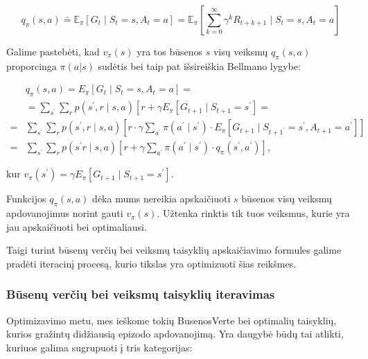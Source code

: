 \documentclass[a4paper, 12pt]{article}
\begin{document}
\begin{equation}
q_{\pi}(s, a) \doteq \mathbb{E}_{\pi}\left[G_{t} \mid S_{t}=s, A_{t}=a\right]=\mathbb{E}_{\pi}\left[\sum_{k=0}^{\infty} \gamma^{k} R_{t+k+1} \mid S_{t}=s, A_{t}=a\right]
\end{equation}

Galime pastebėti, kad $v_{\pi}(s)$ yra tos būsenos $s$ visų veiksmų $q_{\pi}(s, a)$ proporcinga $\pi(a|s)$ sudėtis bei taip pat išsireiškia Bellmano lygybe:

\begin{equation}
\begin{aligned}
& q_{\pi}(s, a)=E_{\pi}\left[G_{t} \mid S_{t}=s, A_{t}=a\right]=\\
&=\sum_{s^{\prime}} \sum_{r} p\left(s^{\prime}, r \mid s, a\right)\left[r+\gamma E_{\pi}\left[G_{t+1} \mid S_{t+1}=s^{\prime}\right]=\right.\\
=& \sum_{s^{\prime}} \sum_{r} p\left(s^{\prime}, r\mid s, a\right)\left[r \cdot \gamma \sum_{a^{\prime}} \pi\left(a^{\prime} \mid s^{\prime}\right) \cdot E_{\pi}\left[G_{t+1} \mid S_{t+1^{\prime}}=s^{\prime}, A_{t+1}=a^{\prime}\right]\right] \\
=& \sum_{s^{\prime}} \sum_{r} p\left(s^{\prime} r \mid s, a\right)\left[r+\gamma \sum_{a^{\prime}} \pi\left(a^{\prime} \mid s^{\prime}\right) \cdot q_{\pi}\left(s^{\prime}, a^{\prime}\right)\right],
\end{aligned}
\end{equation}

kur $v_{\pi}(s^{\prime}) = \gamma E_{\pi}\left[G_{t+1} \mid S_{t+1}=s^{\prime}\right]$.

Funkcijos $q_{\pi}(s, a)$ dėka mums nereikia apskaičiuoti $s$ būsenos visų veiksmų apdovanojimus norint gauti $v_{\pi}(s)$. Užtenka rinktis tik tuos veiksmus, kurie yra jau apskaičiuoti bei optimaliausi.

Taigi turint būsenų verčių bei veiksmų taisyklių apskaičiavimo formules galime pradėti iteracinį procesą, kurio tikslas yra optimizuoti šias reikšmes.

\subsubsection{Būsenų verčių bei veiksmų taisyklių iteravimas}

Optimizavimo metu, mes ieškome tokių \gls{BusenosVerte} bei optimalių taisyklių, kurios gražintų didžiausią epizodo apdovanojimą.
Yra daugybė būdų tai atlikti, kuriuos galima sugrupuoti į tris kategorijas:
\end{document}

